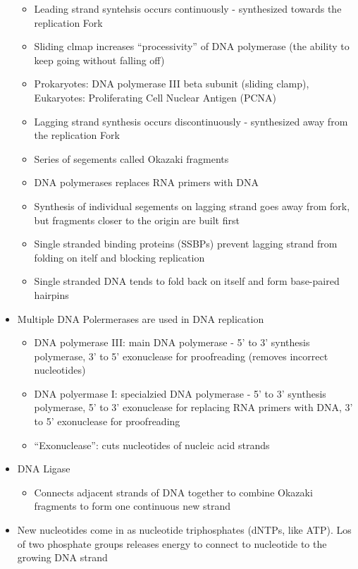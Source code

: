 \documentclass[12pt]{article}
\begin{document}
\begin{itemize}
\begin{itemize}
            \item Leading strand syntehsis occurs continuously - synthesized towards the replication Fork
            \item Sliding clmap increases ``processivity'' of DNA polymerase (the ability to keep going without falling off)
            \item Prokaryotes: DNA polymerase III beta subunit (sliding clamp), Eukaryotes: Proliferating Cell Nuclear Antigen (PCNA)
            \item Lagging strand synthesis occurs discontinuously - synthesized away from the replication Fork
            \item Series of segements called Okazaki fragments
            \item DNA polymerases replaces RNA primers with DNA
            \item Synthesis of individual segements on lagging strand goes away from fork, but fragments closer to the origin are built first
            \item Single stranded binding proteins (SSBPs) prevent lagging strand from folding on itelf and blocking replication
            \item Single stranded DNA tends to fold back on itself and form base-paired hairpins
        \end{itemize}
        \item Multiple DNA Polermerases are used in DNA replication
        \begin{itemize}
            \item DNA polymerase III: main DNA polymerase - 5' to 3' synthesis polymerase, 3' to 5' exonuclease for proofreading (removes incorrect nucleotides)
            \item DNA polyermase I: specialzied DNA polymerase - 5' to 3' synthesis polymerase, 5' to 3' exonuclease for replacing RNA primers with DNA, 3' to 5' exonuclease for proofreading
            \item ``Exonuclease'': cuts nucleotides of nucleic acid strands
        \end{itemize}
        \item DNA Ligase
        \begin{itemize}
            \item Connects adjacent strands of DNA together to combine Okazaki fragments to form one continuous new strand
        \end{itemize}
        \item New nucleotides come in as nucleotide triphosphates (dNTPs, like ATP). Los of two phosphate groups releases energy to connect to nucleotide to the growing DNA strand

\end{itemize}
\end{document}
